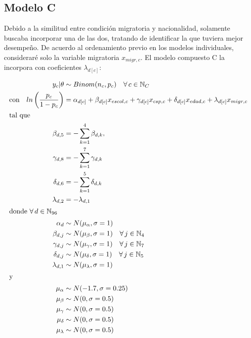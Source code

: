\subsection*{Modelo C}

Debido a la similitud entre condición migratoria y nacionalidad, solamente buscaba incorporar una de las dos, tratando de identificar la que tuviera mejor desempeño. De acuerdo al ordenamiento previo en los modelos individuales, consideraré solo la variable migratoria $x_{migr,c}$. El modelo compuesto C la incorpora con coeficientes $\lambda_{d[c]}$:

\begin{align}\label{eq:Modelo_Comp_C}
y_c|\theta & \sim Binom(n_c,p_c) \quad \forall \, c \in \mathbb{N}_C \nonumber \\
\text{con} \quad ln\left(\dfrac{p_c}{1-p_c}\right) &= \alpha_{d[c]} + \beta_{d[c]} x_{escol,c} + \gamma_{d[c]} x_{csp,c} + \delta_{d[c]} x_{edad,c} + \lambda_{d[c]} x_{migr,c} \\ 
\intertext{tal que} 
\beta_{d,5} &= -\sum\limits_{k = 1}^{4} \beta_{d,k}, \nonumber \\
\gamma_{d,8} &= -\sum\limits_{k = 1}^{7} \gamma_{d,k} \nonumber \\
\delta_{d,6} &= -\sum\limits_{k = 1}^{5} \delta_{d,k} \nonumber \\
\lambda_{d,2} &= -\lambda_{d,1} \nonumber \\
\intertext{donde $\forall \, d \in \mathbb{N}_{96}$}
\alpha_d & \sim N(\mu_{\alpha}, \sigma=1) \quad  \nonumber \\
\beta_{d,j} & \sim N(\mu_{\beta}, \sigma=1) \quad \forall \, j \in \mathbb{N}_{4} \nonumber \\
\gamma_{d,j} & \sim N(\mu_{\gamma}, \sigma=1) \quad \forall \, j \in \mathbb{N}_{7} \nonumber \\
\delta_{d,j} & \sim N(\mu_{\delta}, \sigma=1) \quad \forall \, j \in \mathbb{N}_{5} \nonumber \\
\lambda_{d,1} & \sim N(\mu_{\lambda}, \sigma=1) \nonumber \\
\intertext{y}
\mu_{\alpha} &\sim N(-1.7,\sigma=0.25) \nonumber \\
\mu_{\beta} &\sim N(0,\sigma=0.5) \nonumber \\
\mu_{\gamma} &\sim N(0,\sigma=0.5) \nonumber \\
\mu_{\delta} &\sim N(0,\sigma=0.5) \nonumber \\
\mu_{\lambda} &\sim N(0,\sigma=0.5) \nonumber
\end{align}


